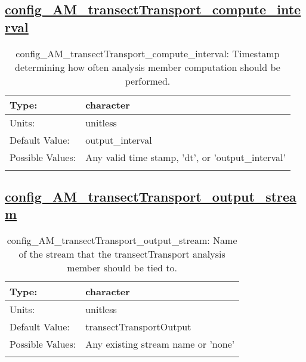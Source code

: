 \subsection[config\_AM\_transectTransport\_compute\_interval]{\hyperref[sec:nm_tab_AM_transectTransport]{config\_AM\_transectTransport\_compute\_interval}}
\label{subsec:nm_sec_config_AM_transectTransport_compute_interval}
\begin{center}
\begin{longtable}{| p{2.0in} || p{4.0in} |}
    \hline
    Type: & character \\
    \hline
    Units: & \si{unitless} \\
    \hline
    Default Value: & output\_interval \\
    \hline
    Possible Values: & Any valid time stamp, 'dt', or 'output\_interval' \\
    \hline
    \caption{config\_AM\_transectTransport\_compute\_interval: Timestamp determining how often analysis member computation should be performed.}
\end{longtable}
\end{center}
\subsection[config\_AM\_transectTransport\_output\_stream]{\hyperref[sec:nm_tab_AM_transectTransport]{config\_AM\_transectTransport\_output\_stream}}
\label{subsec:nm_sec_config_AM_transectTransport_output_stream}
\begin{center}
\begin{longtable}{| p{2.0in} || p{4.0in} |}
    \hline
    Type: & character \\
    \hline
    Units: & \si{unitless} \\
    \hline
    Default Value: & transectTransportOutput \\
    \hline
    Possible Values: & Any existing stream name or 'none' \\
    \hline
    \caption{config\_AM\_transectTransport\_output\_stream: Name of the stream that the transectTransport analysis member should be tied to.}
\end{longtable}
\end{center}
